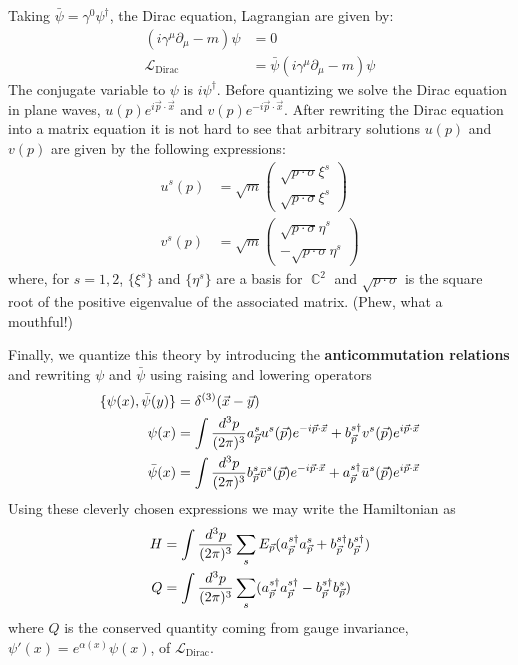 \documentclass{report}
\theoremstyle{plain}
\theoremstyle{definition}
\theoremstyle{remark}
\newcommand{\FR}[2]{\frac{#1}{#2}}
\newcommand{\mc}{\mathcal}
\newcommand{\gam}{\gamma}
\newcommand{\sg}{\sigma}
\newcommand{\di}{\partial}
\newcommand{\ha} { a}
\newcommand{\hb} { b}
\DeclareMathOperator{\bC}{\mathbb{C}}
\begin{document}
Taking $\bar\psi = \gam^0\psi^\dag$, the Dirac equation, Lagrangian are
given by:
\begin{align*}
    (i\gam^\mu\di_\mu - m)\psi &= 0\\
    \mc L_{\text{Dirac}} &= \bar\psi(i\gam^\mu\di_\mu-m)\psi
\end{align*}
The conjugate variable to $\psi$ is $i\psi^\dag$. Before quantizing we
solve the Dirac equation in plane waves, $u(p)e^{i\vec p\cdot
\vec x}$ and $v(p)e^{-i\vec p\cdot \vec x}$. After rewriting the Dirac
equation into a matrix equation it is not hard to see that arbitrary
solutions $u(p)$ and $v(p)$ are given by the following expressions:
\begin{align*}
    u^s(p) &= \sqrt{m}\begin{pmatrix} \sqrt{p\cdot \sg} \xi^s\\
                      \sqrt{p\cdot \sg} \xi^s\end{pmatrix}\\
    v^s(p) &= \sqrt{m}\begin{pmatrix} \sqrt{p\cdot \sg} \eta^s\\
                      -\sqrt{p\cdot \sg} \eta^s\end{pmatrix}
\end{align*}
where, for $s=1,2$, $\{\xi^s\}$ and $\{\eta^s\}$ are a basis for $\bC^2$
and $\sqrt{p\cdot \sg}$ is the square root of the positive eigenvalue of
the associated matrix. (Phew, what a mouthful!)


Finally, we quantize this theory by introducing the \textbf{anticommutation
relations} and rewriting $\psi$ and $\bar\psi$ using raising and lowering
operators
\begin{align} 
\{\psi(x),\bar\psi(y)\} &= \delta^{(3)}(\vec x-\vec y)\\
\psi(x) &= \int \FR{d^3p}{(2\pi)^3} 
\ha^{s}_\vp u^s(\vp) e^{-i\vp\cdot\vx} +
\hb^{s\dag}_\vp v^s(\vp) e^{i\vp\cdot\vx}\label{ferm1} \\
\bar\psi(x) &= \int \FR{d^3p}{(2\pi)^3} 
\hb^{s}_\vp \bar v^s(\vp) e^{-i\vp\cdot\vx} +
\ha^{s\dag}_\vp \bar u^s(\vp) e^{i\vp\cdot\vx}\label{ferm2}
\end{align}
Using these cleverly chosen expressions we may write the Hamiltonian as
\begin{align*}
    H &= \int \FR{d^3p}{(2\pi)^3}  \sum_s
    E_\vp(\ha^{s\dag}_\vp\ha^{s}_\vp+ \hb^{s\dag}_\vp\hb^{s\dag}_\vp)\\
    Q &= \int \FR{d^3p}{(2\pi)^3}  \sum_s
    (\ha^{s\dag}_\vp\ha^{s\dag}_\vp - \hb^{s\dag}_\vp\hb^{s}_\vp)
\end{align*}
where $Q$ is the conserved quantity coming from gauge invariance,
$\psi'(x)=e^{\alpha(x)}\psi(x)$, of $\mc L_{\text{Dirac}}$.
\end{document}
